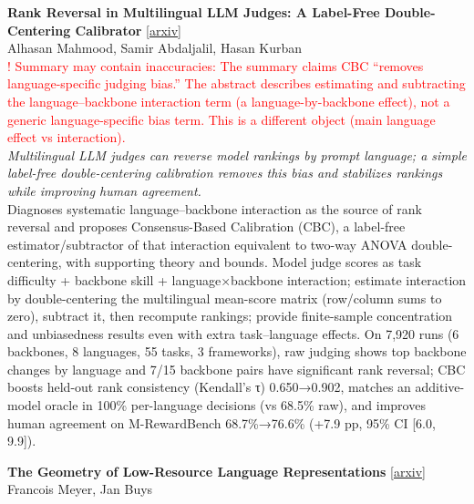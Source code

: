 \documentclass[12pt,letterpaper]{article}
\begin{document}
\medskip

{\small\textbf{Rank Reversal in Multilingual LLM Judges: A Label-Free Double-Centering Calibrator}} {\scriptsize[\href{https://arxiv.org/abs/2608.22432}{arxiv}]}\\
{\scriptsize Alhasan Mahmood, Samir Abdaljalil, Hasan Kurban}\\

{\scriptsize\textcolor{red}{! Summary may contain inaccuracies: The summary claims CBC ``removes language-specific judging bias.'' The abstract describes estimating and subtracting the language--backbone interaction term (a language-by-backbone effect), not a generic language-specific bias term. This is a different object (main language effect vs interaction).}}\\[1pt]

{\small\textit{Multilingual LLM judges can reverse model rankings by prompt language; a simple label-free double-centering calibration removes this bias and stabilizes rankings while improving human agreement.}}\\[1pt]
{\footnotesize Diagnoses systematic language--backbone interaction as the source of rank reversal and proposes Consensus-Based Calibration (CBC), a label-free estimator/subtractor of that interaction equivalent to two-way ANOVA double-centering, with supporting theory and bounds. Model judge scores as task difficulty + backbone skill + language×backbone interaction; estimate interaction by double-centering the multilingual mean-score matrix (row/column sums to zero), subtract it, then recompute rankings; provide finite-sample concentration and unbiasedness results even with extra task--language effects. On 7,920 runs (6 backbones, 8 languages, 55 tasks, 3 frameworks), raw judging shows top backbone changes by language and 7/15 backbone pairs have significant rank reversal; CBC boosts held-out rank consistency (Kendall's τ) 0.650→0.902, matches an additive-model oracle in 100\% per-language decisions (vs 68.5\% raw), and improves human agreement on M-RewardBench 68.7\%→76.6\% (+7.9 pp, 95\% CI [6.0, 9.9]).}

\medskip

{\small\textbf{The Geometry of Low-Resource Language Representations}} {\scriptsize[\href{https://arxiv.org/abs/2608.23358}{arxiv}]}\\
{\scriptsize Francois Meyer, Jan Buys}\\
\end{document}
